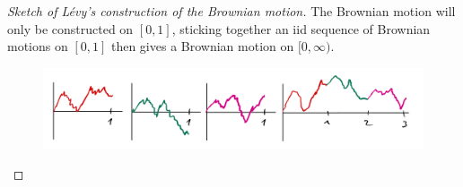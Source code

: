 \begin{proof}[Sketch of L\'evy's construction of the Brownian motion]
	The Brownian motion will only be constructed on $[0,1]$, sticking together an iid sequence of Brownian motions on $[0,1]$ then gives a Brownian motion on $[0,\infty)$.
	\begin{figure}[h]
		\begin{center}
			\includegraphics[scale=0.08]{BML1.jpeg}
		\end{center}
	\end{figure}	


\end{proof}
